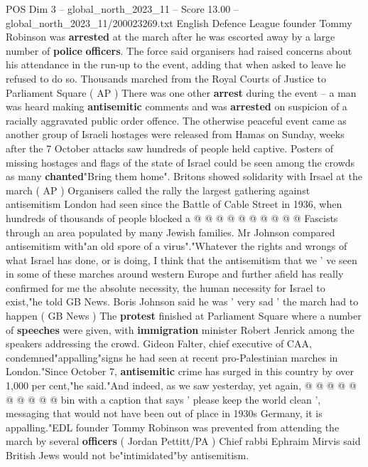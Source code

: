 \begin{textsample}{POS Dim 3 – global\_north\_2023\_11 – Score 13.00 – global\_north\_2023\_11/200023269.txt}  \label{ex:f3_pos_186}
English Defence League founder Tommy Robinson was \textbf{arrested} at the march after he was escorted away by a large number of \textbf{police} \textbf{officers}.
The force said organisers had raised concerns about his attendance in the run-up to the event, adding that when asked to leave he refused to do so.
Thousands marched from the Royal Courts of Justice to Parliament Square ( AP ) There was one other \textbf{arrest} during the event -- a man was heard making \textbf{antisemitic} comments and was \textbf{arrested} on suspicion of a racially aggravated public order offence.
The otherwise peaceful event came as another group of Israeli hostages were released from Hamas on Sunday, weeks after the 7 October attacks saw hundreds of people held captive.
Posters of missing hostages and flags of the state of Israel could be seen among the crowds as many \textbf{chanted}"Bring them home".
Britons showed solidarity with Irsael at the march ( AP ) Organisers called the rally the largest gathering against antisemitism London had seen since the Battle of Cable Street in 1936, when hundreds of thousands of people blocked a @ @ @ @ @ @ @ @ @ @ Fascists through an area populated by many Jewish families.
Mr Johnson compared antisemitism with"an old spore of a virus"."Whatever the rights and wrongs of what Israel has done, or is doing, I think that the antisemitism that we ' ve seen in some of these marches around western Europe and further afield has really confirmed for me the absolute necessity, the human necessity for Israel to exist,"he told GB News.
Boris Johnson said he was ' very sad ' the march had to happen ( GB News ) The \textbf{protest} finished at Parliament Square where a number of \textbf{speeches} were given, with \textbf{immigration} minister Robert Jenrick among the speakers addressing the crowd.
Gideon Falter, chief executive of CAA, condemned"appalling"signs he had seen at recent pro-Palestinian marches in London."Since October 7, \textbf{antisemitic} crime has surged in this country by over 1,000 per cent,"he said."And indeed, as we saw yesterday, yet again, @ @ @ @ @ @ @ @ @ @ bin with a caption that says ' please keep the world clean ', messaging that would not have been out of place in 1930s Germany, it is appalling."EDL founder Tommy Robinson was prevented from attending the march by several \textbf{officers} ( Jordan Pettitt/PA ) Chief rabbi Ephraim Mirvis said British Jews would not be"intimidated"by antisemitism.

\end{textsample}

